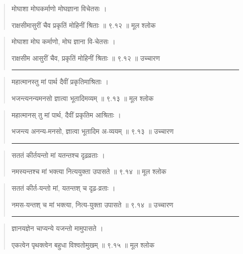 \begin{quotation} 
मोघाशा मोघकर्माणो मोघज्ञाना विचेतसः  ।  

राक्षसीमासुरीं चैव प्रकृतिं मोहिनीं श्रिताः  ॥ ९.१२ ॥  मूल श्लोक
\end{quotation}

\begin{quotation}

मोघाशा मोघ कर्माणो, मोघ ज्ञाना वि-चेतसः  ।  

राक्षसीम आसुरीं चैव, प्रकृतिं मोहिनीं श्रिताः  ॥ ९.१२ ॥  उच्चारण

\noindent\rule{16cm}{0.4pt} 
\end{quotation}


\begin{quotation} 

महात्मानस्तु मां पार्थ दैवीं प्रकृतिमाश्रिताः  ।  

भजन्त्यनन्यमनसो ज्ञात्वा भूतादिमव्यम्‌  ॥ ९.१३ ॥  मूल श्लोक
\end{quotation}

\begin{quotation}

महात्मानस् तु मां पार्थ, दैवीं प्रकृतिम आश्रिताः  ।  

भजन्त्य अनन्य-मनसो, ज्ञात्वा भूतादिम अ-व्ययम्  ॥ ९.१३ ॥  उच्चारण

\noindent\rule{16cm}{0.4pt} 
\end{quotation}


\begin{quotation} 

सततं कीर्तयन्तो मां यतन्तश्च दृढ़व्रताः  ।  

नमस्यन्तश्च मां भक्त्या नित्ययुक्ता उपासते  ॥ ९.१४ ॥  मूल श्लोक
\end{quotation}

\begin{quotation}

सततं कीर्त-यन्तो मां, यतन्तश् च दृढ़-व्रताः  ।  

नमस-यन्तश् च मां भक्त्या, नित्य-युक्ता उपासते  ॥ ९.१४ ॥  उच्चारण

\noindent\rule{16cm}{0.4pt} 
\end{quotation}


\begin{quotation} 

ज्ञानयज्ञेन चाप्यन्ये यजन्तो मामुपासते ।  

एकत्वेन पृथक्त्वेन बहुधा विश्वतोमुखम्  ॥ ९.१५ ॥  मूल श्लोक
\end{quotation}


